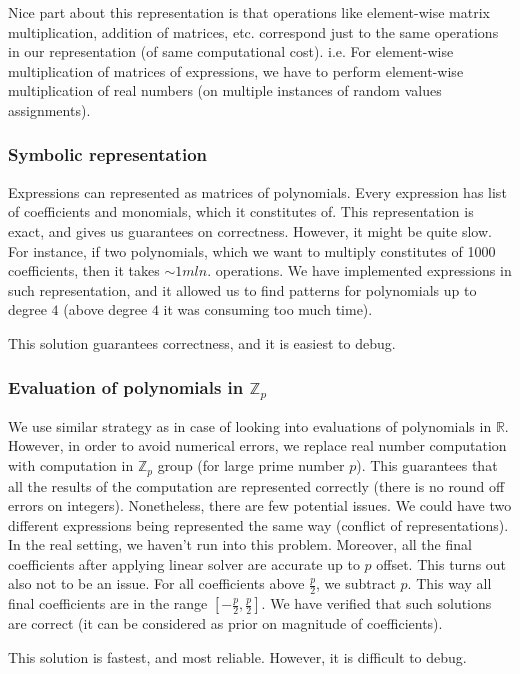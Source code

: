 Nice part about this representation is that operations like element-wise matrix multiplication, addition of matrices, etc.
correspond just to the same operations in our representation (of same computational cost). i.e. For element-wise multiplication of matrices of expressions, we
have to perform element-wise multiplication of real numbers (on multiple instances of random values assignments).

\subsubsection{Symbolic representation}
Expressions can represented as matrices of polynomials. Every expression has list of coefficients and monomials, which it constitutes of.
This representation is exact, and gives us guarantees on correctness. However,
it might be quite slow. For instance, if two polynomials, which we want to multiply constitutes of 1000 coefficients, then
it takes $\sim 1mln.$ operations. We have implemented expressions in such representation, and it allowed us
to find patterns for polynomials up to degree $4$ (above degree $4$ it was consuming too much time).

This solution guarantees correctness, and it is easiest to debug.

\subsubsection{Evaluation of polynomials in $\mathbb{Z}_p$}
We use similar strategy as in case of looking into evaluations of polynomials in $\mathbb{R}$. However, in order
to avoid numerical errors, we replace real number computation with computation in $\mathbb{Z}_p$ group (for large prime number $p$). This
guarantees that all the results of the computation are represented correctly (there is no round off errors on integers). Nonetheless, there are few potential
issues. We could have two different expressions being represented the same way (conflict of representations). In the
real setting, we haven't run into this problem. Moreover, all the final coefficients after applying linear solver are
accurate up to $p$ offset. This turns out also not to be an issue. For all coefficients above $\frac{p}{2}$, we subtract $p$. 
This way all final coefficients are in the range $[-\frac{p}{2}, \frac{p}{2}]$. We have verified that such solutions are correct
(it can be considered as prior on magnitude of coefficients). 

This solution is fastest, and most reliable. However, it is difficult to debug.

